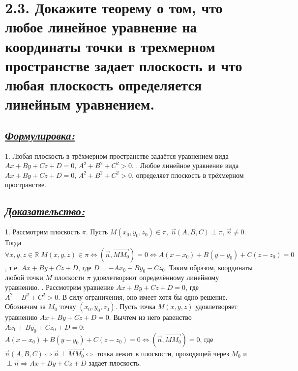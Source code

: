 \documentclass{article}
\begin{document}
\section*{\LARGE 2.3. Докажите теорему о том, что любое линейное уравнение на координаты точки в трехмерном пространстве задает плоскость и что любая плоскость определяется линейным уравнением. }
\subsection*{\Large \underline{\textit{Формулировка: }}}
1. Любая плоскость в трёхмерном пространстве задаётся уравнением вида $Ax + By + Cz + D = 0,\, A^2 + B^2 + C^2 > 0$.
. Любое линейное уравнение вида $Ax + By + Cz + D = 0,\, A^2 + B^2 + C^2 > 0$, определяет плоскость в трёхмерном пространстве.

\subsection*{\Large \underline{\textit{Доказательство: }}}
1. Рассмотрим плоскость $\pi$. Пусть $M(x_0, y_0, z_0) \in \pi,\; \vec{n}(A, B, C) \perp \pi,\, \vec{n} \ne 0$. Тогда $\forall x,y,z \in \mathbb{R} \; M(x, y, z) \in \pi \Leftrightarrow (\vec{n}, \overrightarrow{MM_0}) = 0 \Leftrightarrow A(x - x_0) + B(y - y_0) + C(z - z_0) = 0$, т.е. $Ax + By + Cz + D$, где $D = -Ax_0 - By_0 - Cz_0$. Таким образом, координаты любой точки $M$ плоскости $\pi$ удовлетворяют определённому линейному уравнению.
. Рассмотрим уравнение $Ax + By + Cz + D = 0$, где $A^2 + B^2 + C^2 > 0$. В силу ограничения, оно имеет хотя бы одно решение. Обозначим за $M_0$ точку $(x_0, y_0, z_0)$. Пусть точка $M(x, y, z)$ удовлетворяет уравнению $Ax + By + Cz + D = 0$. Вычтем из него равенство $Ax_0 + By_0 + Cz_0 + D = 0$: $A(x - x_0) + B(y - y_0) + C(z - z_0) = 0 \Leftrightarrow (\vec{n}, \overrightarrow{MM_0}) = 0$, где $\vec{n}(A, B, C) \Leftrightarrow \vec{n} \perp \overrightarrow{MM_0} \Leftrightarrow$ точка лежит в плоскости, проходящей через $M_0$ и $\perp \vec{n} \Rightarrow Ax + By + Cz + D$ задает плоскость.

\end{document}
